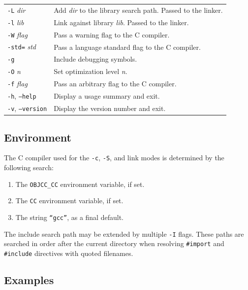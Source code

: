 \documentclass[11pt,twoside]{article}
\newcommand{\meta}[1]{{\itshape #1}}
\begin{document}
\begin{tabularx}{\textwidth}{lX}
{\tt -L} {\meta{dir}}
         & Add {\meta{dir}} to the library search path.  Passed to the
           linker. \\[4pt]
{\tt -l} {\meta{lib}}
         & Link against library {\meta{lib}}.  Passed to the linker.
           \\[4pt]
{\tt -W} {\meta{flag}}
         & Pass a warning flag to the C compiler. \\[4pt]
{\tt -std=} {\meta{std}}
         & Pass a language standard flag to the C compiler. \\[4pt]
{\tt -g}  & Include debugging symbols. \\[4pt]
{\tt -O} {\meta{n}}
         & Set optimization level {\meta{n}}. \\[4pt]
{\tt -f} {\meta{flag}}
         & Pass an arbitrary flag to the C compiler. \\[4pt]
{\tt -h}, {\tt --help}
         & Display a usage summary and exit. \\[4pt]
{\tt -v}, {\tt --version}
         & Display the version number and exit. \\
\end{tabularx}

\subsection{Environment}

The C compiler used for the {\tt -c}, {\tt -S}, and link modes is
determined by the following search:

\begin{enumerate}
  \item The {\tt OBJCC\_CC} environment variable, if set.
  \item The {\tt CC} environment variable, if set.
  \item The string {\tt ``gcc''}, as a final default.
\end{enumerate}

The include search path may be extended by multiple {\tt -I} flags.
These paths are searched in order after the current directory when
resolving {\tt \#import} and {\tt \#include} directives with quoted
filenames.

\subsection{Examples}
\end{document}
